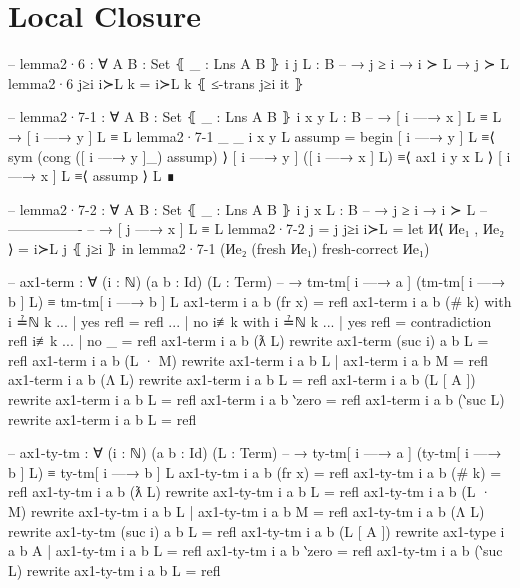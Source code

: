 \documentclass[logo,bsc,singlespacing,parskip,online]{infthesis}
\begin{document}
\section{Local Closure}
\label{appendix:f_local_closure}
\begin{code}
  -- lemma2·6 : ∀ {A B : Set} ⦃ _ : Lns A B ⦄ {i j} {L : B}
  --   → j ≥ i → i ≻ L → j ≻ L
  lemma2·6 j≥i i≻L k = i≻L k ⦃ ≤-trans j≥i it ⦄

  -- lemma2·7-1 : ∀ {A B : Set} ⦃ _ : Lns A B ⦄ {i x y} {L : B}
  --   → [ i —→ x ] L ≡ L → [ i —→ y ] L ≡ L
  lemma2·7-1 {_} {_} {i} {x} {y} {L} assump =
    begin
      [ i —→ y ] L
    ≡⟨ sym (cong ([ i —→ y ]_) assump) ⟩
      [ i —→ y ] ([ i —→ x ] L)
    ≡⟨ ax1 i y x L ⟩
      [ i —→ x ] L
    ≡⟨ assump ⟩
      L
    ∎

  -- lemma2·7-2 : ∀ {A B : Set} ⦃ _ : Lns A B ⦄ {i j x} {L : B}
  --   → j ≥ i    → i ≻ L
  --     ----------------
  --   → [ j —→ x ] L ≡ L
  lemma2·7-2 {j = j} j≥i i≻L =
    let И⟨ Иe₁ , Иe₂ ⟩ = i≻L j ⦃ j≥i ⦄ in
      lemma2·7-1 (Иe₂ (fresh Иe₁) {fresh-correct Иe₁})
\end{code}
\begin{code}
  -- ax1-term : ∀ (i : ℕ) (a b : Id) (L : Term)
  --   → tm-tm[ i —→ a ] (tm-tm[ i —→ b ] L) ≡ tm-tm[ i —→ b ] L
  ax1-term i a b (fr x) = refl
  ax1-term i a b (# k) with i ≟ℕ k
  ... | yes refl = refl
  ... | no  i≢k  with i ≟ℕ k
  ... |   yes refl = contradiction refl i≢k
  ... |   no  _    = refl
  ax1-term i a b (ƛ L) rewrite ax1-term (suc i) a b L = refl
  ax1-term i a b (L · M)
    rewrite ax1-term i a b L | ax1-term i a b M = refl
  ax1-term i a b (Λ L) rewrite ax1-term i a b L = refl
  ax1-term i a b (L [ A ]) rewrite ax1-term i a b L = refl
  ax1-term i a b ‵zero = refl
  ax1-term i a b (‵suc L) rewrite ax1-term i a b L = refl

  -- ax1-ty-tm : ∀ (i : ℕ) (a b : Id) (L : Term)
  --   → ty-tm[ i —→ a ] (ty-tm[ i —→ b ] L) ≡ ty-tm[ i —→ b ] L
  ax1-ty-tm i a b (fr x) = refl
  ax1-ty-tm i a b (# k) = refl
  ax1-ty-tm i a b (ƛ L) rewrite
    ax1-ty-tm i a b L = refl
  ax1-ty-tm i a b (L · M) rewrite
    ax1-ty-tm i a b L | ax1-ty-tm i a b M = refl
  ax1-ty-tm i a b (Λ L)
    rewrite ax1-ty-tm (suc i) a b L = refl
  ax1-ty-tm i a b (L [ A ])
    rewrite ax1-type i a b A | ax1-ty-tm i a b L = refl
  ax1-ty-tm i a b ‵zero = refl
  ax1-ty-tm i a b (‵suc L)
    rewrite ax1-ty-tm i a b L = refl
\end{code}
\end{document}
